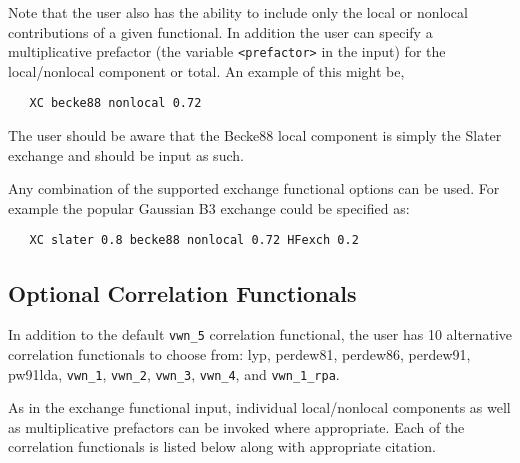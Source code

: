Note that the user also has the ability to include only the local or
nonlocal contributions of a given functional.  In addition the user
can specify a multiplicative prefactor (the variable
\verb+<prefactor>+ in the input) for the local/nonlocal component or
total.  An example of this might be,
\begin{verbatim}
   XC becke88 nonlocal 0.72
\end{verbatim}
The user should be aware that the Becke88 local component is simply
the Slater exchange and should be input as such.

Any combination of the supported exchange functional options can be
used.  For example the popular Gaussian B3 exchange could be specified
as:
\begin{verbatim}
   XC slater 0.8 becke88 nonlocal 0.72 HFexch 0.2
\end{verbatim}

  
\subsection{Optional Correlation Functionals}

In addition to the default \verb+vwn_5+ correlation functional, the user has
10 alternative correlation functionals to choose from: lyp, perdew81,
perdew86, perdew91, pw91lda, \verb+vwn_1+, \verb+vwn_2+, \verb+vwn_3+,
\verb+vwn_4+, and \verb+vwn_1_rpa+.

As in the exchange functional input, individual local/nonlocal
components as well as multiplicative prefactors can be invoked where
appropriate.  Each of the correlation functionals is listed below along with
appropriate citation. 

\sloppy

